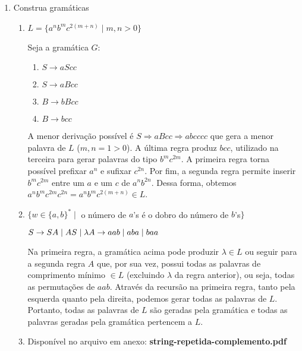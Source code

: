 \documentclass[brazil, a4paper,12pt]{article}
\begin{document}
\begin{enumerate}

\item Construa gramáticas
  \begin{enumerate}
    \item $L = \{a^nb^mc^{2(m+n)} \mid m, n > 0\}$

    Seja a gramática $G$:

    \begin{enumerate}
      \item $S \rightarrow aScc$ \label{regra1a1}
      \item $S \rightarrow aBcc$ \label{regra1a2}
      \item $B \rightarrow bBcc$ \label{regra1a3}
      \item $B \rightarrow bcc$ \label{regra1a4}
    \end{enumerate}

    A menor derivação possível é $S \Rightarrow aBcc \Rightarrow abcccc$ que
    gera a menor palavra de $L$ ($m, n = 1 > 0$). A última regra produz
    $bcc$, utilizado na terceira para gerar palavras do tipo $b^mc^{2m}$. A
    primeira regra torna possível prefixar $a^n$ e sufixar $c^{2n}$. Por
    fim, a segunda regra permite inserir $b^mc^{2m}$ entre um $a$ e um $c$
    de $a^nb^{2n}$. Dessa forma, obtemos $a^nb^mc^{2m}c^{2n} =
    a^nb^mc^{2(m+n)} \in L$.

    \item $\{w \in \{a,b\}^* \mid$ o número de $a$'s é o dobro do número de
    $b$'s$\}$

    $S \rightarrow SA \mid AS \mid \lambda\\
     A \rightarrow aab \mid aba \mid baa$

     Na primeira regra, a gramática acima pode produzir $\lambda \in L$ ou
     seguir para a segunda regra $A$ que, por sua vez, possui todas as palavras
     de comprimento mínimo $\in L$ (excluindo $\lambda$ da regra anterior), ou
     seja, todas as permutações de $aab$. Através da recursão na primeira regra,
     tanto pela esquerda quanto pela direita, podemos gerar todas as palavras de
     $L$.  Portanto, todas as palavras de $L$ são geradas pela gramática e todas
     as palavras geradas pela gramática pertencem a $L$.


  \item Disponível no arquivo em anexo: \textbf{string-repetida-complemento.pdf}


\end{enumerate}
\end{enumerate}
\end{document}
